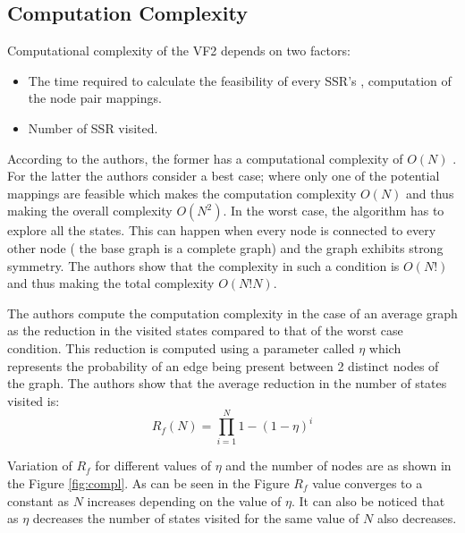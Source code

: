 \subsection{Computation Complexity}
Computational complexity of the VF2 depends on two factors: 
\begin{itemize}
\item The time required to calculate the feasibility of every SSR's , computation of the node pair mappings.
\item Number of SSR visited.
\end{itemize}

According to the authors, the former has a computational complexity of $O(N)$ . For the latter the authors consider a best case; where only one of the potential mappings are feasible which makes the computation complexity $O(N)$ and thus making the overall complexity $O(N^2)$. In the worst case, the algorithm has to explore all the states. This can happen when every node is connected to every other node ( the base graph is a complete graph) and the graph exhibits strong symmetry. The authors show that the complexity in such a condition is $O(N!)$ and thus making the total complexity $O(N!N)$.

The authors compute the computation complexity in the case of an average graph as the reduction in the visited states compared to that of the worst case condition. This reduction is computed using a parameter called $\eta$ which represents the probability of an edge being present between 2 distinct nodes of the graph. The authors show that the average reduction in the number of states visited is:
\begin{equation*}
R_{f}(N) = \prod_{i=1}^{N} 1-(1-\eta)^{i}
\end{equation*}

 
 Variation of $R_f$ for different values of $\eta$ and the number of nodes are as shown in the Figure \ref{fig:compl}. As can be seen in the Figure $R_f$ value converges to a constant as $N$ increases depending on the value of $\eta$. It can also be noticed that as $\eta$ decreases the number of states visited for the same value of $N$ also decreases.
 

